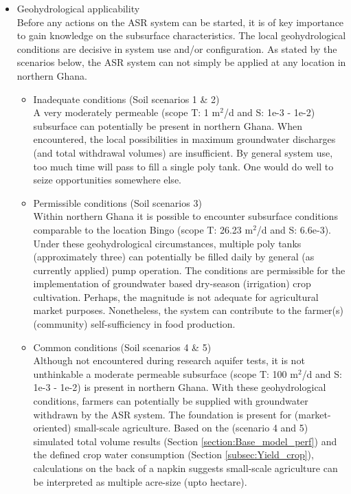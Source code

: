 \begin{itemize}
\item{Geohydrological applicability} \\
Before any actions on the ASR system can be started, it is of key importance to gain knowledge on the subsurface characteristics. The local geohydrological conditions are decisive in system use and/or configuration. As stated by the scenarios below, the ASR system can not simply be applied at any location in northern Ghana.  
\begin{itemize}
\item{Inadequate conditions (Soil scenarios 1 \& 2)}\\
A very moderately permeable (scope T: 1 m$^2$/d and S: 1e-3 - 1e-2) subsurface can potentially be present in northern Ghana. When encountered, the local possibilities in maximum groundwater discharges (and total withdrawal volumes) are insufficient. By general system use, too much time will pass to fill a single poly tank. One would do well to seize opportunities somewhere else. 
\item{Permissible conditions (Soil scenarios 3)}\\
Within northern Ghana it is possible to encounter subsurface conditions comparable to the location Bingo (scope T: 26.23 m$^2$/d and S: 6.6e-3). Under these geohydrological circumstances, multiple poly tanks (approximately three) can potentially be filled daily by general (as currently applied) pump operation. The conditions are permissible for the implementation of groundwater based dry-season (irrigation) crop cultivation. Perhaps, the magnitude is not adequate for agricultural market purposes. Nonetheless, the system can contribute to the farmer(s) (community) self-sufficiency in food production. 
\item{Common conditions (Soil scenarios 4 \& 5)}\\
Although not encountered during research aquifer tests, it is not unthinkable a moderate permeable subsurface (scope T: 100 m$^2$/d and S: 1e-3 - 1e-2) is present in northern Ghana. With these geohydrological conditions, farmers can potentially be supplied with groundwater withdrawn by the ASR system. The foundation is present for (market-oriented) small-scale agriculture. Based on the (scenario 4 and 5) simulated total volume results (Section \ref{section:Base_model_perf}) and the defined crop water consumption (Section \ref{subsec:Yield_crop}), calculations on the back of a napkin suggests small-scale agriculture can be interpreted as multiple acre-size (upto hectare).  
\end{itemize}


\end{itemize}
